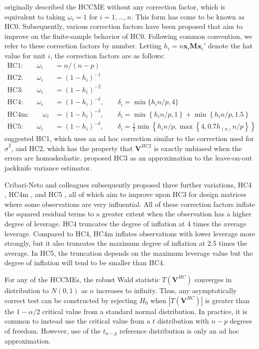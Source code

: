 \documentclass[12pt]{article}\usepackage[]{graphicx}\usepackage[]{color}
\newcommand{\bm}{\mathbf}
\begin{document}
\citet{White1980heteroskedasticity} originally described the HCCME without any correction factor, which is equivalent to taking $\omega_i = 1$ for $i = 1,...,n$. 
This form has come to be known as HC0. 
Subsequently, various correction factors have been proposed that aim to improve on the finite-sample behavior of HC0. 
Following common convention, we refer to these correction factors by number. Letting $h_i = n \bm{x}_i \bm{M} \bm{x}_i'$ denote the hat value for unit $i$, the correction factors are as follows:
\begin{align*}
\text{HC1:} \qquad \omega_i &= n / (n - p) \\
\text{HC2:} \qquad \omega_i &= (1 - h_i)^{-1} \\
\text{HC3:} \qquad \omega_i &= (1 - h_i)^{-2} \\
\text{HC4:} \qquad \omega_i &= (1 - h_i)^{-\delta}, \qquad \delta_i = \min\{h_i n / p, 4\} \\
\text{HC4m:} \qquad \omega_i &= (1 - h_i)^{-\delta}, \qquad \delta_i = \min\left\{h_i n / p, 1 \right\} + \min\left\{h_i n / p, 1.5 \right\} \\
\text{HC5:} \qquad \omega_i &= (1 - h_i)^{-\delta}, \qquad \delta_i = \frac{1}{2}\min\left\{h_i n / p, \max \left\{4, 0.7 h_{(n)} n / p\right\}\right\}
\end{align*}
\citet{MacKinnon1985some} suggested HC1, which uses an ad hoc correction similar to the correction used for $\hat\sigma^2$, and HC2, which has the property that $\bm{V}^{HC2}$ is exactly unbiased when the errors are homoskedastic. 
\citet{Davidson1993estimation} proposed HC3 as an approximation to the leave-on-out jackknife variance estimator. 

Cribari-Neto and colleagues subsequently proposed three further variations, HC4 \citep{Cribari-Neto2004asymptotic}, HC4m \citep{Cribari-Neto2011new}, and HC5 \citep{Cribari-Neto2007inference}, all of which aim to improve upon HC3 for design matrices where some observations are very influential. 
All of these correction factors inflate the squared residual terms to a greater extent when the observation has a higher degree of leverage. 
HC4 truncates the degree of inflation at 4 times the average leverage. 
Compared to HC4, HC4m inflates observations with lower leverage more strongly, but it also truncates the maximum degree of inflation at 2.5 times the average. 
In HC5, the truncation depends on the maximum leverage value but the degree of inflation will tend to be smaller than HC4. 

For any of the HCCMEs, the robust Wald statistic $T\left(\bm{V}^{HC}\right)$ converges in distribution to $N(0,1)$ as $n$ increases to infinity. 
Thus, any asymptotically correct test can be constructed by rejecting $H_0$ when $\left|T\left(\bm{V}^{HC}\right)\right|$ is greater than the $1 - \alpha / 2$ critical value from a standard normal distribution. 
In practice, it is common to instead use the critical value from a $t$ distribution with $n - p$ degrees of freedom. 
However, use of the $t_{n-p}$ reference distribution is only an ad hoc approximation.
\end{document}
